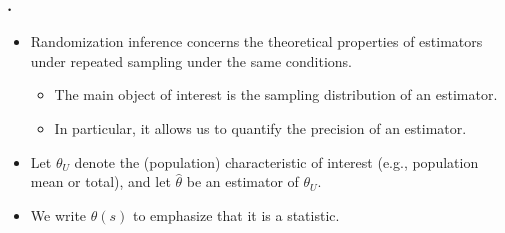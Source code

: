 \documentclass{my_eth_beamer}
\numberwithin{equation}{section}
\begin{document}
\begin{frame}
    \frametitle{\insertsectionnumber.\insertsubsectionnumber~\insertsubsection}
    \begin{itemize}
    \setlength{\itemsep}{14pt}
        \item \alert{Randomization inference} concerns the
            \alert{theoretical properties} of estimators under
            \alert{repeated sampling} under the same conditions.
            \vspace{0.5em}
            \begin{itemize}
            \setlength{\itemsep}{6pt}
                \item[\goto] The main object of interest is the
                    \alert{sampling distribution} of an estimator.
                \item[\goto] In particular, it allows us to \alert{quantify the
                    precision of an estimator}.
            \end{itemize}
        \item Let $\theta_U$ denote the (population) characteristic of
            interest (e.g., population mean or total), and let
            $\widehat{\theta}$ be an estimator of $\theta_U$.
        \item We write $\widehat{\theta}(s)$ to emphasize that it is a
            \alert{statistic}.
    \end{itemize}
\end{frame}
\end{document}
